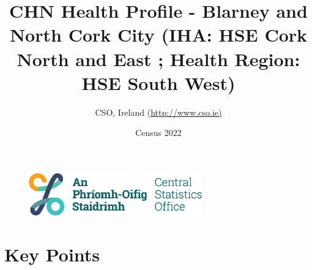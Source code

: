 \documentclass{article}
\title{CHN Health Profile - Blarney and North Cork City (IHA: HSE Cork North and East ;  Health Region: HSE South West) }
\date{Census 2022}
\author{CSO, Ireland  (\url{http://www.cso.ie)}}
\begin{document}


\begin{figure}
	\centering
\includegraphics[width =75mm]{../figures/CSO_Logo.png}
\end{figure}

				 
		   
						  
														  
																																													
												 
			 
\maketitle
					
													   
				 
						 
																																																																											   
				 
				  
  \pagebreak
    	    \tableofcontents

\pagebreak


\section{Key Points}
\end{document}
